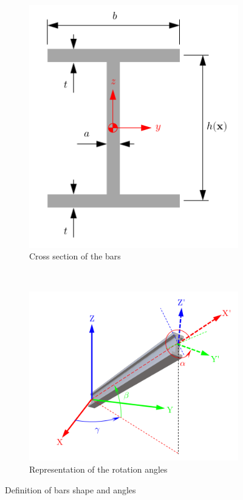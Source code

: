 \begin{figure}[h]
	\centering
	\begin{subfigure}{0.45\textwidth}
		\includegraphics[width=\textwidth]{img/cross_section}
		\caption{Cross section of the bars}
		\label{fig:cross_section}
	\end{subfigure}
	~ %
	\begin{subfigure}{0.45\textwidth}
		\includegraphics[width=\textwidth]{img/angles.png}
		\caption{Representation of the rotation angles}
		\label{fig:angles}
	\end{subfigure}
	\caption{Definition of bars shape and angles}
	\label{fig:bars_and_angles}
\end{figure}


